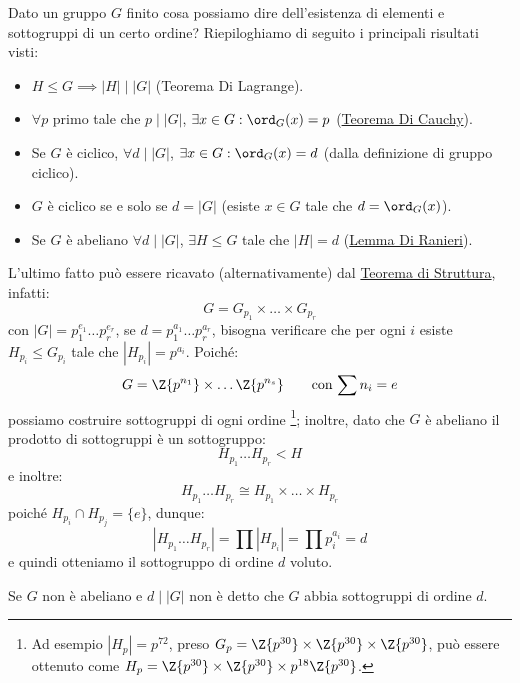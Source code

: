 \documentclass[11pt]{scrartcl}
\begin{document}
\begin{remark}
    Dato un gruppo $G$ finito cosa possiamo dire dell'esistenza di elementi e sottogruppi di un certo ordine? Riepiloghiamo di seguito i principali risultati visti:
        \begin{itemize}
            \item $H \leqslant G \implies |H| \mid |G|$ (Teorema Di Lagrange).
            \item $\forall p$ primo tale che $p \mid |G|$, $\exists x \in G : \ord_G(x) = p$ (\hyperref[p:Cauchy]{Teorema Di Cauchy}).
            \item Se $G$ è ciclico, $\forall d \mid |G|$, $\exists x \in G : \ord_G(x) = d$ (dalla definizione di gruppo ciclico).
            \item $G$ è ciclico se e solo se $d = |G|$ (esiste $x \in G$ tale che $d = \ord_G(x)$).
            \item Se $G$ è abeliano $\forall d \mid |G|$, $\exists H \leqslant G$ tale che $|H| = d$ (\hyperref[davide]{Lemma Di Ranieri}).
        \end{itemize}
\end{remark}
L'ultimo fatto può essere ricavato (alternativamente) dal \hyperref[t:struttura]{Teorema di Struttura}, infatti:
    \[ G = G_{p_1} \times \ldots \times G_{p_r}
        \]
con $|G| = p_1^{e_1}\ldots p_r^{e_r}$, se $d = p_1^{a_1}\ldots p_r^{a_r}$, bisogna verificare che per ogni $i$ esiste $H_{p_i} \leqslant G_{p_i}$ tale che $|H_{p_i}| = p^{a_i}$.
Poiché:
    \[ G = \Z{p^{n_1}} \times \ldots \Z{p^{n_s}} \qquad \text{con $\sum n_i = e$}
        \]
possiamo costruire sottogruppi di ogni ordine \footnote{Ad esempio $|H_p| = p^{72}$, preso $G_p = \Z{p^{30}} \times \Z{p^{30}} \times \Z{p^{30}}$, può essere ottenuto come $H_p = \Z{p^{30}} \times \Z{p^{30}} \times p^{18} \Z{p^{30}}$.};
inoltre, dato che $G$ è abeliano il prodotto di sottogruppi è un sottogruppo:
    \[ H_{p_1}\ldots H_{p_r} < H
        \]
e inoltre:
    \[ H_{p_1}\ldots H_{p_r} \cong H_{p_1} \times \ldots \times H_{p_r}
        \]
poiché $H_{p_i} \cap H_{p_j} = \{e\}$, dunque:
    \[ |H_{p_1}\ldots H_{p_r}| = \prod |H_{p_i}| = \prod p_{i}^{a_i} = d
        \]
e quindi otteniamo il sottogruppo di ordine $d$ voluto.
    
\begin{remark}
    Se $G$ non è abeliano e $d \mid |G|$ non è detto che $G$ abbia sottogruppi di ordine $d$.
\end{remark}
\end{document}
